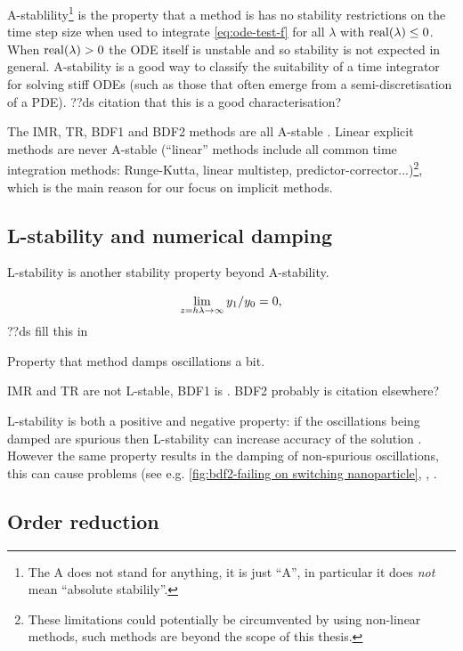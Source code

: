 A-stablility\footnote{The A does not stand for anything, it is just ``A''\cite[pg. 40]{HairerWanner}, in particular it does \emph{not} mean ``absolute stabilily''.} is the property that a method is has no stability restrictions on the time step size when used to integrate \eqref{eq:ode-test-f} for all $\lambda$ with $\operatorname{real}(\lambda) \leq 0$.
When $\operatorname{real}(\lambda) > 0$ the ODE itself is unstable and so stability is not expected in general.
A-stability is a good way to classify the suitability of a time integrator for solving stiff ODEs (such as those that often emerge from a semi-discretisation of a PDE).
??ds citation that this is a good characterisation?

The IMR, TR, BDF1 and BDF2 methods are all A-stable \cite[pgs. 43, 251]{HairerWanner}.
Linear explicit methods are never A-stable \cite{Nevanlinna1974} (``linear'' methods include all common time integration methods: Runge-Kutta, linear multistep, predictor-corrector...)\footnote{These limitations could potentially be circumvented by using non-linear methods, such methods are beyond the scope of this thesis.}, which is the main reason for our focus on implicit methods.


\subsection{L-stability and numerical damping}
\label{sec:imr-l-stability}

L-stability is another stability property beyond A-stability.


\begin{equation}
  \lim_{z=h\lambda \rightarrow \infty} y_1/y_0 = 0,
\end{equation}
??ds fill this in

Property that method damps oscillations a bit.

IMR and TR are not L-stable, BDF1 is \cite[pg. 45]{HairerWanner}. BDF2 probably is citation elsewhere?

L-stability is both a positive and negative property: if the oscillations being damped are spurious then L-stability can increase accuracy of the solution \cite[pg. 45]{HairerWanner}.
However the same property results in the damping of non-spurious oscillations, this can cause problems (see e.g. \autoref{fig:bdf2-failing on switching nanoparticle}, \cite[pg. 242]{GreshoSani}, \cite{Elman2011}.


\subsection{Order reduction}
\label{sec:order-reduction}


